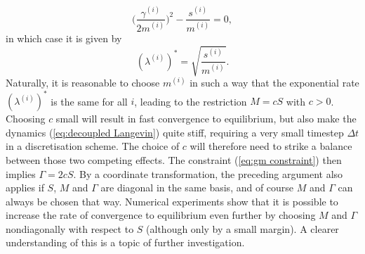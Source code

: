 \begin{remark}
	\begin{equation}
	\bigg(\frac{\gamma^{(i)}}{2m^{(i)}}\bigg)^{2}-\frac{s^{(i)}}{m^{(i)}}=0,\label{eq:gm constraint}
	\end{equation}
	in which case it is given by 
	\[
	(\lambda^{(i)})^{*}=\sqrt{\frac{s^{(i)}}{m^{(i)}}}.
	\]
	Naturally, it is reasonable to choose $m^{(i)}$ in such a way that
	the exponential rate $(\lambda^{(i)})^{*}$ is the same for all $i$, leading
	to the restriction $M=cS$ with $c>0$. Choosing $c$ small will result in fast convergence to equilibrium,
	but also make the dynamics (\ref{eq:decoupled Langevin}) quite stiff,
	requiring a very small timestep $\Delta t$ in a discretisation scheme.
	The choice of $c$ will therefore need to strike a balance between
	those two competing effects. The constraint (\ref{eq:gm constraint})
	then implies $\Gamma=2cS$.	 By a coordinate transformation, the preceding argument also applies if $S$, $M$ and $\Gamma$ are diagonal in the same basis, and of course $M$ and $\Gamma$ can always be chosen that way.
	Numerical experiments show that it is possible to increase the rate of convergence to equilibrium even further by choosing $M$ and $\Gamma$ nondiagonally with respect to $S$ (although
	only by a small margin). A clearer understanding of this is a topic of further investigation.
\end{remark}
